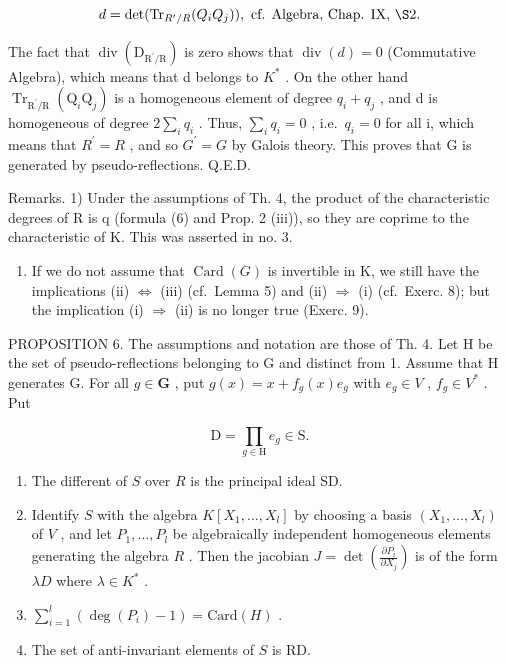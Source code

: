 \[
d = \det (\mathrm{Tr} _ {R ^ {\prime} / R} (Q _ {i} Q _ {j})), \text { cf.   Algebra,   Chap.   IX, } \S 2.
\]

The fact that \(\operatorname{div}(\mathrm{D}_{\mathrm{R}^{\prime}/\mathrm{R}})\) is zero shows that \(\operatorname{div}(d)=0\) (Commutative Algebra), which means that d belongs to \(K^{*}\) . On the other hand \(\operatorname{Tr}_{\mathrm{R}^{\prime}/\mathrm{R}}(\mathrm{Q}_{i}\mathrm{Q}_{j})\) is a homogeneous element of degree \(q_{i}+q_{j}\) , and d is homogeneous of degree \(2\sum_{i}q_{i}\) . Thus, \(\sum_{i}q_{i}=0\) , i.e.~\(q_{i}=0\) for all i, which means that \(R^{\prime}=R\) , and so \(G^{\prime}=G\) by Galois theory. This proves that G is generated by pseudo-reflections. Q.E.D.

Remarks. 1) Under the assumptions of Th. 4, the product of the characteristic degrees of R is q (formula (6) and Prop. 2 (iii)), so they are coprime to the characteristic of K. This was asserted in no. 3.

\begin{enumerate}
\def\labelenumi{\arabic{enumi})}
\setcounter{enumi}{1}
\tightlist
\item
  If we do not assume that \(\operatorname{Card}(G)\) is invertible in K, we still have the implications (ii) \(\Longleftrightarrow\) (iii) (cf.~Lemma 5) and (ii) \(\Longrightarrow\) (i) (cf.~Exerc. 8); but the implication (i) \(\Longrightarrow\) (ii) is no longer true (Exerc. 9).
\end{enumerate}

PROPOSITION 6. The assumptions and notation are those of Th. 4. Let H be the set of pseudo-reflections belonging to G and distinct from 1. Assume that H generates G. For all \(g \in \mathbf{G}\) , put \(g(x) = x + f_g(x)e_g\) with \(e_g \in V\) , \(f_g \in V^*\) . Put

\[
\mathrm{D} = \prod_ {g \in \mathrm{H}} e _ {g} \in \mathrm{S}.
\]

\begin{enumerate}
\def\labelenumi{(\roman{enumi})}
\item
  The different of \(S\) over \(R\) is the principal ideal SD.
\item
  Identify \(S\) with the algebra \(K[X_1, \ldots, X_l]\) by choosing a basis \((X_1, \ldots, X_l)\) of \(V\) , and let \(P_1, \ldots, P_l\) be algebraically independent homogeneous elements generating the algebra \(R\) . Then the jacobian \(J = \det\left(\frac{\partial P_i}{\partial X_j}\right)\) is of the form \(\lambda D\) where \(\lambda \in K^*\) .
\item
  \(\sum_{i=1}^{l} (\deg(P_i) - 1) = \text{Card}(H)\) .
\item
  The set of anti-invariant elements of \(S\) is RD.
\end{enumerate}

